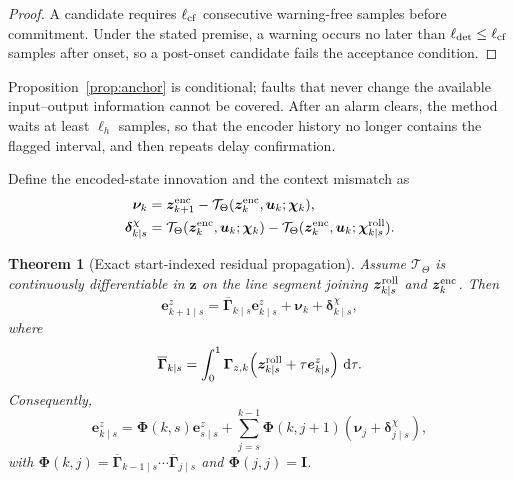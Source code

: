 \documentclass[journal]{IEEEtran}
\newtheorem{theorem}{Theorem}
\newcommand{\1}{\bm 1}
\begin{document}
\begin{proof}
A candidate requires $\ell_{\rm cf}$ consecutive warning-free samples before
commitment. Under the stated premise, a warning occurs no later than
$\ell_{\rm det}\leq\ell_{\rm cf}$ samples after onset, so a post-onset
candidate fails the acceptance condition.
\end{proof}

Proposition~\ref{prop:anchor} is conditional; faults that never change the
available input--output information cannot be covered. After an alarm clears,
the method waits at least $\ell_h$ samples, so that the encoder history no
longer contains the flagged interval, and then repeats delay confirmation.

Define the encoded-state innovation and the context mismatch as
\begin{equation}
\begin{aligned}
\bm\nu_k
&=\bm z_{k+1}^{\rm enc}
-\mathcal T_\Theta(\bm z_k^{\rm enc},\bm u_k;\bm\chi_k),\\
\bm\delta_{k\mid s}^{\chi}
&=\mathcal T_\Theta(\bm z_k^{\rm enc},\bm u_k;\bm\chi_k)
-\mathcal T_\Theta(\bm z_k^{\rm enc},\bm u_k;
\bm\chi_{k\mid s}^{\rm roll}).
\end{aligned}
\label{eq:innovation_context}
\end{equation}

\begin{theorem}[Exact start-indexed residual propagation]
\label{thm:exact}
Assume $\mathcal T_\Theta$ is continuously differentiable in $\bm z$ on the
line segment joining $\bm z_{k\mid s}^{\rm roll}$ and
$\bm z_k^{\rm enc}$. Then
\begin{equation}
\bm e_{k+1\mid s}^z
=\overline{\bm\Gamma}_{k\mid s}\bm e_{k\mid s}^z
+\bm\nu_k+\bm\delta_{k\mid s}^{\chi},
\label{eq:exact_recursion}
\end{equation}
where
\begin{equation}
\overline{\bm\Gamma}_{k\mid s}=
\int_0^1
\bm\Gamma_{z,k}\!\left(
\bm z_{k\mid s}^{\rm roll}
+\tau\bm e_{k\mid s}^z\right)\,\mathrm d\tau.
\label{eq:averaged_jacobian}
\end{equation}
Consequently,
\begin{equation}
\bm e_{k\mid s}^z=
\bm\Phi(k,s)\bm e_{s\mid s}^z+
\sum_{j=s}^{k-1}\bm\Phi(k,j+1)
(\bm\nu_j+\bm\delta_{j\mid s}^{\chi}),
\label{eq:finite_propagation}
\end{equation}
with $\bm\Phi(k,j)=
\overline{\bm\Gamma}_{k-1\mid s}\cdots
\overline{\bm\Gamma}_{j\mid s}$ and
$\bm\Phi(j,j)=\bm I$.
\end{theorem}
\end{document}
